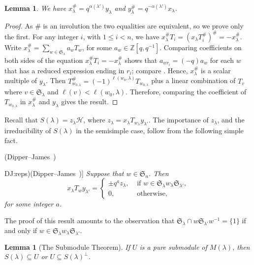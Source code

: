 \documentclass[twoside]{amsart}
\def\If{\text{\ if\ }}
\def\Otherwise{\text{\ otherwise}}
\numberwithin{equation}{section}
\newtheorem{Lemma}[equation]{Lemma}
\theoremstyle{remark}
\newenvironment{Point}[2]%
  {\ifx*#2\let\pointlabel\relax\else\def\pointlabel{#2}\fi
   \refstepcounter{equation}\trivlist
   \item[\hskip\labelsep\theequation\bf
         \ifx\pointlabel\relax\else\space\pointlabel\space\fi]
   \ignorespaces #1
  }{\relax}
\let\ss\subseteq
\def\Z{{\mathbb Z}}
\def\len(#1){\ell(#1)}
\def\H{\mathscr H}
\def\Sym{\mathfrak S}
\begin{document}
\begin{Lemma}\label{hash}
We have $x_\lambda^\# = q^{\alpha(\lambda')} y_\lambda$ and 
$y_\lambda^\# = q^{-\alpha(\lambda')} x_\lambda$.
\end{Lemma}

\begin{proof}
As $\#$ is an involution the two equalities are equivalent, so we
prove only the first.  For any integer $i$, with $1\le i < n$, we have
$x_\lambda^\# T_i=(x_\lambda T_i^\#)^\# = -x_\lambda^\#$. Write
$x_\lambda^\# = \sum_{w\in \Sym_\lambda} a_w T_w$, for some
$a_w\in\Z[q,q^{-1}]$.  Comparing coefficients on both sides of the
equation $x_\lambda^\# T_i=-x_\lambda^\#$ shows that $a_{wr_i} = (-q)
a_w$ for each $w$ that has a reduced expression ending in $r_i$;
compare \cite[Cor.~1.7]{M:IHA}. Hence, $x_\lambda^\#$ is a scalar multiple of
$y_\lambda$. Then
$T_{w_{0,\lambda}}^\#=(-1)^{\len(w_{0,\lambda})}T_{w_{0,\lambda}}$
plus a linear combination of $T_v$ where $v\in\Sym_\lambda$ and
$\len(v)<\len(w_{0,\lambda})$. Therefore, comparing the coefficient of
$T_{w_{0,\lambda}}$ in $x_\lambda^\#$ and $y_\lambda$ gives the
result.
\end{proof}

Recall that $S(\lambda)=z_\lambda\H$, where 
$z_\lambda=x_\lambda T_{w_\lambda} y_{\lambda'}$. The importance of
$z_\lambda$, and the irreducibility of $S(\lambda)$ in the semisimple
case, follow from the following simple fact.

\begin{Point}\it{(Dipper--James~\cite[Lemma~4.1]{DJ:reps})}\label{vanishing}
Suppose that $w\in\Sym_n$. Then 
$$x_\lambda T_w y_{\lambda'}=\begin{cases}
       \pm q^a z_\lambda,&\If w\in\Sym_\lambda w_\lambda\Sym_{\lambda'},\\
                       0,&\Otherwise,
\end{cases}$$
for some integer $a$.
\end{Point}

The proof of this result amounts to the observation that
$\Sym_\lambda\cap w\Sym_{\lambda'}w^{-1}=\{1\}$ if and only if
$w\in\Sym_\lambda w_\lambda\Sym_{\lambda'}$. 

\begin{Lemma}[The Submodule Theorem]
\label{LemJST}
If $U$ is a pure submodule of $M(\lambda)$, then $S(\lambda)\ss U$ or $U\ss S(\lambda)^\perp$.
\end{Lemma}
\end{document}
